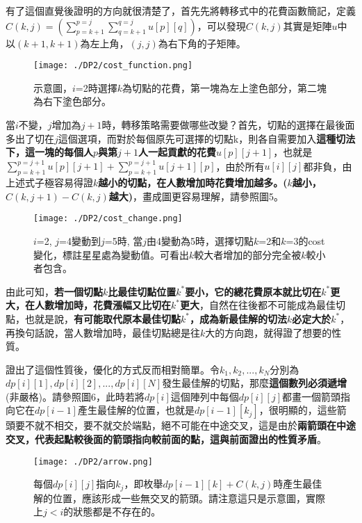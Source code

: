 有了這個直覺後證明的方向就很清楚了，首先先將轉移式中的花費函數簡記，定義$C(k, j) = (\sum_{p = k + 1}^{p = j} \sum_{q = k + 1}^{q = j} u[p][q])$，可以發現$C(k, j)$其實是矩陣$u$中以$(k + 1, k + 1)$為左上角，$(j, j)$為右下角的子矩陣。

\begin{figure}[h!]
	\begin{center}
		\centerline{\texttt{[image: ./DP2/cost\_function.png]}}
		\caption{示意圖，$i$=2時選擇$k$為切點的花費，第一塊為左上塗色部分，第二塊為右下塗色部分。}
	\end{center}
\end{figure}
當$i$不變，$j$增加為$j + 1$時，轉移策略需要做哪些改變？首先，切點的選擇在最後面多出了切在$j$這個選項，而對於每個原先可選擇的切點k，則各自需要加入\textbf{這種切法下，這一塊的每個人$p$與第$j+1$人一起貢獻的花費$u[p][j + 1]$}，也就是$\sum_{p = k + 1}^{p = j + 1} u[p][j + 1] + \sum_{p = k + 1}^{p = j + 1} u[j + 1][p]$，由於所有$u[i][j]$都非負，由上述式子極容易得證\textbf{$k$越小的切點，在人數增加時花費增加越多。($k$越小，$C(k, j + 1) - C(k, j)$越大)}，畫成圖更容易理解，請參照圖5。

\begin{figure}[h!]
	\begin{center}
		\centerline{\texttt{[image: ./DP2/cost\_change.png]}}
		\caption{$i$=2, $j$=4變動到$j$=5時, 當$j$由4變動為5時，選擇切點$k$=2和$k$=3的cost變化，標註星星處為變動值。可看出$k$較大者增加的部分完全被$k$較小者包含。}
	\end{center}
\end{figure}

由此可知，\textbf{若一個切點$k$比最佳切點位置$k^*$要小，它的總花費原本就比切在$k^*$更大，在人數增加時，花費漲幅又比切在$k^*$更大}，自然在往後都不可能成為最佳切點，也就是說，\textbf{有可能取代原本最佳切點$k^*$，成為新最佳解的切法$k$必定大於$k^*$}，再換句話說，當人數增加時，最佳切點總是往$k$大的方向跑，就得證了想要的性質。

證出了這個性質後，優化的方式反而相對簡單。令$k_1, k_2, ..., k_N$分別為$dp[i][1], dp[i][2], ..., dp[i][N]$發生最佳解的切點，那麼\textbf{這個數列必須遞增}(非嚴格)。請參照圖6，此時若將$dp[i]$這個陣列中每個$dp[i][j]$都畫一個箭頭指向它在$dp[i - 1]$產生最佳解的位置，也就是$dp[i - 1][k_j]$，很明顯的，這些箭頭要不就不相交，要不就交於端點，絕不可能在中途交叉，這是由於\textbf{兩箭頭在中途交叉，代表起點較後面的箭頭指向較前面的點，這與前面證出的性質矛盾}。

\begin{figure}[h]
	\begin{center}
		\centerline{\texttt{[image: ./DP2/arrow.png]}}
		\caption{每個$dp[i][j]$指向$k_j$，即枚舉$dp[i - 1][k] + C(k, j)$時產生最佳解的位置，應該形成一些無交叉的箭頭。請注意這只是示意圖，實際上$j < i$的狀態都是不存在的。}
	\end{center}
\end{figure}

